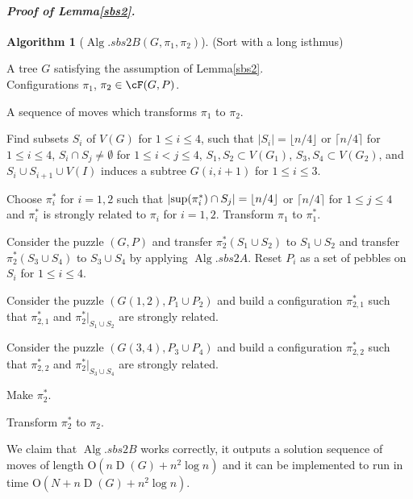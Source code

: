 \documentclass[letter,11pt]{article}
\newcommand{\white}{\qquad{\framebox{\rule{0pt}{4pt}}}}
\newcommand{\owari}{\hfill\white}
\theoremstyle{definition}
\theoremstyle{definition}
\newtheorem{alg}{Algorithm}
\DeclareMathOperator{\Alg}{Alg}
\DeclareMathOperator{\D}{D}
\newcommand{\1}{\boldmath$~1~$\unboldmath}
\newcommand{\Ord}{\mathrm{O}}
\newcommand{\qedgo}{\vspace{0.35cm}}
\newcommand{\tume}{\hspace*{0.2em}}
\newcommand{\maru}[1]{{\ooalign{\hfill$\small#1$\hfill\crcr\scalebox{1.3}{$\bigcirc$}}}}
\newenvironment{alg-enumerate}{%
  \begin{enumerate}%
   \renewcommand{\theenumi}{\arabic{enumi}}%
   \renewcommand{\labelenumi}{\rm{{\maru{\theenumi}}\tume\/}}%
   \renewcommand{\labelenumii}{\rm{$(${\maru{\theenumi}}-\theenumii$)$\tume\/}}%
 }{\end{enumerate}%
}
\newenvironment{Proofof}[1]{\expandafter
\paragraph{{\it Proof of #1.}}}{\hspace{5mm}\owari\qedgo}
\newcommand{\namelistlabel}[1]{\hspace*{10pt}\mbox{#1}:\hspace{\fill}}
\newenvironment{namelist}[1]{%
    \begin{list}{}
      {\let\makelabel\namelistlabel
      \settowidth{\labelwidth}{#1}
      \setlength{\leftmargin}{1.1\labelwidth}
      \setlength{\labelsep}{5pt}
      \setlength{\parsep}{0pt}}
  }{%
  \end{list}}
\begin{document}
\begin{Proofof}{Lemma\tume\ref{sbs2}}
\begin{alg}[$\Alg.sbs2B(G, \pi_1, \pi_2)$](Sort with a long isthmus)\hfill
\begin{namelist}{OUTPUT}
\item[\sl Input]{A tree $G$ satisfying the assumption of Lemma\tume\ref{sbs2}.\\
Configurations $\pi_1$, $\pi_2 \in \cF(G, P)$.
}
\item[\sl Output]{A sequence of moves which transforms $\pi_1$ to $\pi_2$.}
\end{namelist}
\begin{alg-enumerate}
\item Find subsets $S_i$ of $V(G)$ for $1 \le i \le 4$, such that $|S_i| = \lfloor n/4 \rfloor$ or $\lceil n/4 \rceil$ for $1 \le i \le 4$, $S_i \cap S_j \ne \emptyset$ for $1 \le i < j \le 4$, $S_1, S_2 \subset V(G_1)$, $S_3, S_4 \subset V(G_2)$, and $S_i \cup S_{i+1} \cup V(I)$ induces a subtree $G(i, i+1)$ for $1 \le i \le 3$.
\item Choose $\pi_i^{\ast}$ for $i = 1, 2$ such that $|{\rm sup}(\pi_i^{\ast}) \cap S_j| = \lfloor n/4 \rfloor$ or $\lceil n/4 \rceil$ for $1 \le j \le 4$ and $\pi_i^{\ast}$ is strongly related to $\pi_i$ for $i = 1, 2$.
Transform $\pi_1$ to $\pi_1^{\ast}$.
\item Consider the puzzle $(G, P)$ and transfer $\pi_2^{\ast}(S_1 \cup S_2)$ to $S_1 \cup S_2$ and transfer $\pi_2^{\ast}(S_3 \cup S_4)$ to $S_3 \cup S_4$ by applying $\Alg.sbs2A$.
Reset $P_i$ as a set of pebbles on $S_i$ for $1 \le i \le 4$.
\item 
Consider the puzzle $(G(1,2), P_1 \cup P_2)$ and build a configuration $\pi_{2,1}^{\ast}$ 
such that $\pi_{2,1}^{\ast}$ and $\pi_2^{\ast}|_{S_1 \cup S_2}$ are strongly related.
\item
Consider the puzzle $(G(3,4), P_3 \cup P_4)$ and build a configuration $\pi_{2,2}^{\ast}$ 
such that $\pi_{2,2}^{\ast}$ and $\pi_2^{\ast}|_{S_3 \cup S_4}$ are strongly related.
\item Make $\pi_2^{\ast}$.
\item Transform $\pi_2^{\ast}$ to $\pi_2$.
\end{alg-enumerate}
\end{alg}

We claim that $\Alg.sbs2B$ works correctly, it outputs a solution sequence of moves of length $\Ord (n\D(G) + n^2 \log n) $ and it can be implemented to run in time $\Ord (N + n\D(G) + n^2 \log n)$.


\end{Proofof}
\end{document}
